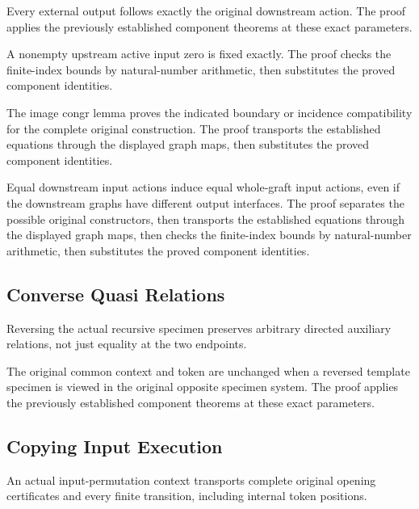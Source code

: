 Every external output follows exactly the original downstream action.
The proof applies the previously established component theorems at these exact parameters.
\par{}

A nonempty upstream active input zero is fixed exactly.
The proof checks the finite-index bounds by natural-number arithmetic, then substitutes the proved component identities.
\par{}

The image congr lemma proves the indicated boundary or incidence compatibility for the complete original construction.
The proof transports the established equations through the displayed graph maps, then substitutes the proved component identities.
\par{}

Equal downstream input actions induce equal whole-graft input actions,
even if the downstream graphs have different output interfaces.
The proof separates the possible original constructors, then transports the established equations through the displayed graph maps, then checks the finite-index bounds by natural-number arithmetic, then substitutes the proved component identities.
\par{}

\subsection{Converse Quasi Relations}
Reversing the actual recursive specimen preserves arbitrary directed
auxiliary relations, not just equality at the two endpoints.

The original common context and token are unchanged when a reversed
template specimen is viewed in the original opposite specimen system.
The proof applies the previously established component theorems at these exact parameters.
\par{}

\subsection{Copying Input Execution}
An actual input-permutation context transports complete original opening
certificates and every finite transition, including internal token positions.

